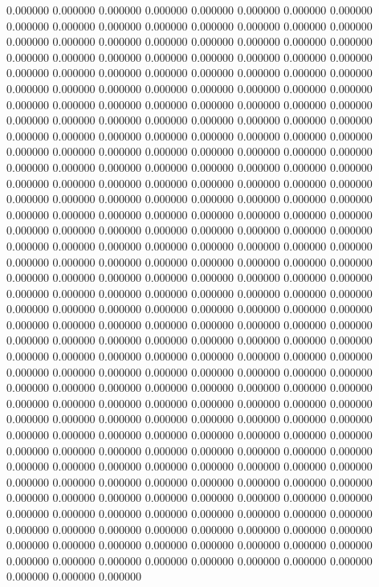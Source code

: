 0.000000 0.000000 0.000000
0.000000 0.000000 0.000000
0.000000 0.000000 0.000000
0.000000 0.000000 0.000000
0.000000 0.000000 0.000000
0.000000 0.000000 0.000000
0.000000 0.000000 0.000000
0.000000 0.000000 0.000000
0.000000 0.000000 0.000000
0.000000 0.000000 0.000000
0.000000 0.000000 0.000000
0.000000 0.000000 0.000000
0.000000 0.000000 0.000000
0.000000 0.000000 0.000000
0.000000 0.000000 0.000000
0.000000 0.000000 0.000000
0.000000 0.000000 0.000000
0.000000 0.000000 0.000000
0.000000 0.000000 0.000000
0.000000 0.000000 0.000000
0.000000 0.000000 0.000000
0.000000 0.000000 0.000000
0.000000 0.000000 0.000000
0.000000 0.000000 0.000000
0.000000 0.000000 0.000000
0.000000 0.000000 0.000000
0.000000 0.000000 0.000000
0.000000 0.000000 0.000000
0.000000 0.000000 0.000000
0.000000 0.000000 0.000000
0.000000 0.000000 0.000000
0.000000 0.000000 0.000000
0.000000 0.000000 0.000000
0.000000 0.000000 0.000000
0.000000 0.000000 0.000000
0.000000 0.000000 0.000000
0.000000 0.000000 0.000000
0.000000 0.000000 0.000000
0.000000 0.000000 0.000000
0.000000 0.000000 0.000000
0.000000 0.000000 0.000000
0.000000 0.000000 0.000000
0.000000 0.000000 0.000000
0.000000 0.000000 0.000000
0.000000 0.000000 0.000000
0.000000 0.000000 0.000000
0.000000 0.000000 0.000000
0.000000 0.000000 0.000000
0.000000 0.000000 0.000000
0.000000 0.000000 0.000000
0.000000 0.000000 0.000000
0.000000 0.000000 0.000000
0.000000 0.000000 0.000000
0.000000 0.000000 0.000000
0.000000 0.000000 0.000000
0.000000 0.000000 0.000000
0.000000 0.000000 0.000000
0.000000 0.000000 0.000000
0.000000 0.000000 0.000000
0.000000 0.000000 0.000000
0.000000 0.000000 0.000000
0.000000 0.000000 0.000000
0.000000 0.000000 0.000000
0.000000 0.000000 0.000000
0.000000 0.000000 0.000000
0.000000 0.000000 0.000000
0.000000 0.000000 0.000000
0.000000 0.000000 0.000000
0.000000 0.000000 0.000000
0.000000 0.000000 0.000000
0.000000 0.000000 0.000000
0.000000 0.000000 0.000000
0.000000 0.000000 0.000000
0.000000 0.000000 0.000000
0.000000 0.000000 0.000000
0.000000 0.000000 0.000000
0.000000 0.000000 0.000000
0.000000 0.000000 0.000000
0.000000 0.000000 0.000000
0.000000 0.000000 0.000000
0.000000 0.000000 0.000000
0.000000 0.000000 0.000000
0.000000 0.000000 0.000000
0.000000 0.000000 0.000000
0.000000 0.000000 0.000000
0.000000 0.000000 0.000000
0.000000 0.000000 0.000000
0.000000 0.000000 0.000000
0.000000 0.000000 0.000000
0.000000 0.000000 0.000000
0.000000 0.000000 0.000000
0.000000 0.000000 0.000000
0.000000 0.000000 0.000000
0.000000 0.000000 0.000000
0.000000 0.000000 0.000000
0.000000 0.000000 0.000000
0.000000 0.000000 0.000000
